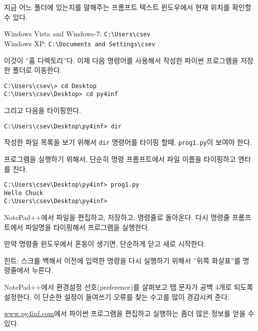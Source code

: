 지금 어느 폴더에 있는지를 말해주는 프롬프트 텍스트 윈도우에서 현재 위치를 확인할 수 있다.

Windows Vista and Windows-7: {\tt C:{\textbackslash}Users{\textbackslash}csev}\\
Windows XP: {\tt C:{\textbackslash}Documents and Settings{\textbackslash}csev}

이것이 ''홈 디렉토리''다. 이제 다음 명령어를 사용해서 작성한 파이썬 프로그램을 저장한 폴더로 이동한다.

\beforeverb
\begin{verbatim}
C:\Users\csev\> cd Desktop
C:\Users\csev\Desktop> cd py4inf
\end{verbatim}
\afterverb
%

그리고 다음을 타이핑한다.

\beforeverb
\begin{verbatim}
C:\Users\csev\Desktop\py4inf> dir 
\end{verbatim}
\afterverb
%

작성한 파일 목록을 보기 위해서 {\tt dir} 명령어를 타이핑 할때, {\tt prog1.py}이 보여야 한다.

프로그램을 실행하기 위해서, 단순히 명령 프롬프트에서 파일 이름을 타이핑하고 엔터를 친다.

\beforeverb
\begin{verbatim}
C:\Users\csev\Desktop\py4inf> prog1.py
Hello Chuck
C:\Users\csev\Desktop\py4inf> 
\end{verbatim}
\afterverb
%

NotePad++에서 파일을 편집하고, 저장하고, 명령줄로 돌아온다.
다시 명령줄 프롬프트에서 파일명을 타이핑해서 프로그램을 실행한다.

만약 명령줄 윈도우에서 혼동이 생기면, 단순하게 닫고 새로 시작한다.

힌트: 스크롤 백해서 이전에 입력한 명령을 다시 실행하기 위해서 ''위쪽 화살표''를 명령줄에서 누른다.

NotePad++에서 환경설정 선호(preference)를 살펴보고 탭 문자가 공백 4개로 되도록 설정한다.
이 단순한 설정이 들여쓰기 오류를 찾는 수고를 많이 경감시켜 준다.

\url{www.py4inf.com}에서 파이썬 프로그램을 편집하고 실행하는 좀더 많은 정보를 얻을 수 있다.


